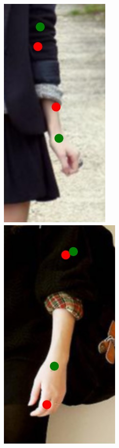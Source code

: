 \begin{figure}
    \includegraphics[height=\fh]{resources/Annotation_Correction/Fixing/fix_6}
    \hfill
    \includegraphics[height=\fh]{resources/Annotation_Correction/Fixing/fix_7}
    \hfill

\end{figure}

